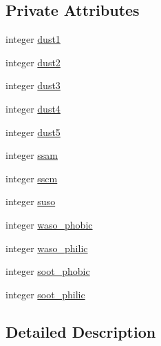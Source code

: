 \subsection*{Private Attributes}
\begin{DoxyCompactItemize}
\item 
integer \hyperlink{structmodule__radiation__aerosols_1_1gocart__index__type_ae87b7754284ce0d44cab3ab11c7d302d}{dust1}
\item 
integer \hyperlink{structmodule__radiation__aerosols_1_1gocart__index__type_aaf95cb5b3df728ac3b333edd8ab7820f}{dust2}
\item 
integer \hyperlink{structmodule__radiation__aerosols_1_1gocart__index__type_a5d844db6dd6100b45808b5e19b468a84}{dust3}
\item 
integer \hyperlink{structmodule__radiation__aerosols_1_1gocart__index__type_a26a20aa03ac34523cc19644000d4924e}{dust4}
\item 
integer \hyperlink{structmodule__radiation__aerosols_1_1gocart__index__type_a7d24acaa59ee8524dd8eca8f91f740c6}{dust5}
\item 
integer \hyperlink{structmodule__radiation__aerosols_1_1gocart__index__type_a911c3dc2e5722a38166950003a4d0875}{ssam}
\item 
integer \hyperlink{structmodule__radiation__aerosols_1_1gocart__index__type_a814b63e33cdf9c3e1e470406056a9fcb}{sscm}
\item 
integer \hyperlink{structmodule__radiation__aerosols_1_1gocart__index__type_a1556732edff9dba1d6593a1117af056f}{suso}
\item 
integer \hyperlink{structmodule__radiation__aerosols_1_1gocart__index__type_a9975caaff0c49d25180699beb469601f}{waso\+\_\+phobic}
\item 
integer \hyperlink{structmodule__radiation__aerosols_1_1gocart__index__type_a05425c83c167f7820a126c72e561a4da}{waso\+\_\+philic}
\item 
integer \hyperlink{structmodule__radiation__aerosols_1_1gocart__index__type_abe87221aca998b4d7ca231525e7dc355}{soot\+\_\+phobic}
\item 
integer \hyperlink{structmodule__radiation__aerosols_1_1gocart__index__type_ac382ab82531e2f1cb6021b786666f004}{soot\+\_\+philic}
\end{DoxyCompactItemize}


\subsection{Detailed Description}


